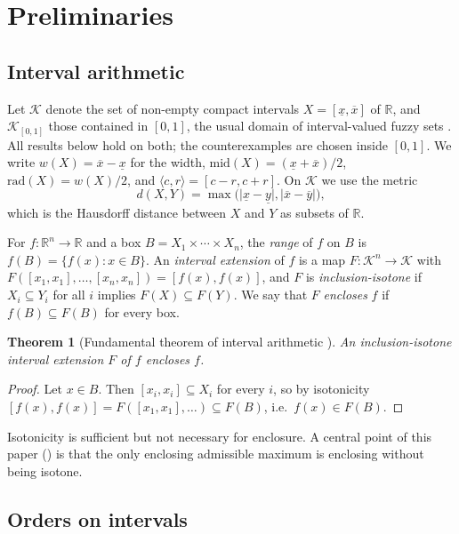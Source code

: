 \documentclass[preprint,12pt]{elsarticle}
\newtheorem{theorem}{Theorem}[section]
\theoremstyle{definition}
\newcommand{\R}{\mathbb{R}}
\newcommand{\K}{\mathcal{K}}
\newcommand{\lo}[1]{\underline{#1}}
\newcommand{\up}[1]{\overline{#1}}
\newcommand{\abs}[1]{\lvert #1\rvert}
\begin{document}
\section{Preliminaries}
\label{sec:prelim}

\subsection{Interval arithmetic}

Let $\K$ denote the set of non-empty compact intervals $X=[\lo x,\up x]$ of $\R$, and $\K_{[0,1]}$ those contained in $[0,1]$, the usual domain of interval-valued fuzzy sets \cite{zadeh1975}. All results below hold on both; the counterexamples are chosen inside $[0,1]$. We write $w(X)=\up x-\lo x$ for the width, $\mathrm{mid}(X)=(\lo x+\up x)/2$, $\mathrm{rad}(X)=w(X)/2$, and $\langle c,r\rangle=[c-r,c+r]$. On $\K$ we use the metric
\[
d(X,Y)=\max\big(\abs{\lo x-\lo y},\abs{\up x-\up y}\big),
\]
which is the Hausdorff distance between $X$ and $Y$ as subsets of $\R$.

For $f:\R^n\to\R$ and a box $B=X_1\times\cdots\times X_n$, the \emph{range} of $f$ on $B$ is $f(B)=\{f(x):x\in B\}$. An \emph{interval extension} of $f$ is a map $F:\K^n\to\K$ with $F([x_1,x_1],\dots,[x_n,x_n])=[f(x),f(x)]$, and $F$ is \emph{inclusion-isotone} if $X_i\subseteq Y_i$ for all $i$ implies $F(X)\subseteq F(Y)$. We say that $F$ \emph{encloses} $f$ if $f(B)\subseteq F(B)$ for every box.

\begin{theorem}[Fundamental theorem of interval arithmetic {\cite{moore2009}}]\label{thm:fund}
An inclusion-isotone interval extension $F$ of $f$ encloses $f$.
\end{theorem}

\begin{proof}
Let $x\in B$. Then $[x_i,x_i]\subseteq X_i$ for every $i$, so by isotonicity $[f(x),f(x)]=F([x_1,x_1],\dots)\subseteq F(B)$, i.e.\ $f(x)\in F(B)$.
\end{proof}

Isotonicity is sufficient but not necessary for enclosure. A central point of this paper () is that the only enclosing admissible maximum is enclosing without being isotone.

\subsection{Orders on intervals}
\end{document}
